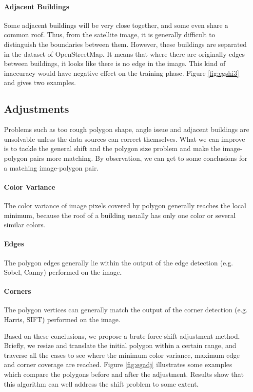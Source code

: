 \paragraph{Adjacent Buildings}
Some adjacent buildings will be very close together, and some even share a common roof. Thus, from the satellite image, it is generally difficult to distinguish the boundaries between them. However, these buildings are separated in the dataset of OpenStreetMap. It means that where there are originally edges between buildings, it looks like there is no edge in the image. This kind of inaccuracy would have  negative effect on the training phase. Figure \ref{fig:egshi3} and gives two examples.

\subsection{Adjustments}\label{adjust}
Problems such as too rough polygon shape, angle issue and adjacent buildings are unsolvable unless the data sources can correct themselves. What we can improve is to tackle the general shift and the polygon size problem and make the image-polygon pairs more matching. By observation, we can get to some conclusions for a matching image-polygon pair.



\paragraph{Color Variance}
The color variance of image pixels covered by polygon generally reaches the local minimum, because the roof of a building usually has only one color or several similar colors.

\paragraph{Edges}
The polygon edges generally lie within the output of the edge detection (e.g. Sobel, Canny) performed on the image.

\paragraph{Corners}
The polygon vertices can generally match the output of the corner detection (e.g. Harris, SIFT) performed on the image.

Based on these conclusions, we propose a brute force shift adjustment method. Briefly, we resize and translate the initial polygon within a certain range, and traverse all the cases to see where the minimum color variance, maximum edge and corner coverage are reached. Figure \ref{fig:egadj} illustrates some examples which compare the polygons before and after the adjustment. Results show that this algorithm can well address the shift problem to some extent.


